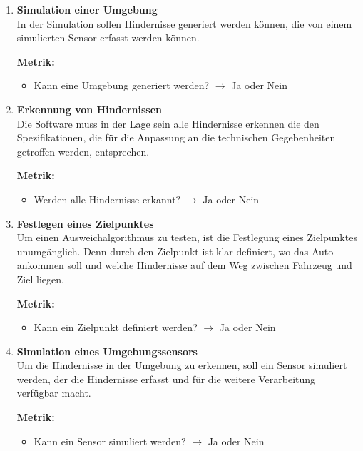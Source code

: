 \begin{enumerate}[leftmargin=*]
    \item \textbf{Simulation einer Umgebung}\\
    In der Simulation sollen Hindernisse generiert werden können, die von einem simulierten Sensor erfasst werden können.

    \textbf{Metrik:} 
    \begin{itemize}
        \item Kann eine Umgebung generiert werden? $\to$ Ja oder Nein
    \end{itemize}
    
    \item \textbf{Erkennung von Hindernissen}\\
    Die Software muss in der Lage sein alle Hindernisse erkennen die den Spezifikationen, 
    die für die Anpassung an die technischen Gegebenheiten getroffen werden, 
    entsprechen.

    \textbf{Metrik:} 
    \begin{itemize}
        \item Werden alle Hindernisse erkannt? $\to$ Ja oder Nein
    \end{itemize}
    
    \item \textbf{Festlegen eines Zielpunktes}\\
    Um einen Ausweichalgorithmus zu testen, ist die Festlegung eines Ziel\-punktes unumgänglich. 
    Denn durch den Zielpunkt ist klar definiert, wo das Auto ankommen soll und welche Hindernisse auf dem Weg zwischen Fahrzeug und Ziel liegen.

    \textbf{Metrik:} 
    \begin{itemize}
        \item Kann ein Zielpunkt definiert werden? $\to$ Ja oder Nein
    \end{itemize}
    
    \item \textbf{Simulation eines Umgebungssensors}\\
    Um die Hindernisse in der Umgebung zu erkennen, soll ein Sensor simuliert werden, der die Hindernisse erfasst und für die weitere Verarbeitung verfügbar macht.

    \textbf{Metrik:}
    \begin{itemize}
        \item Kann ein Sensor simuliert werden? $\to$ Ja oder Nein
    \end{itemize}
    

\end{enumerate}
